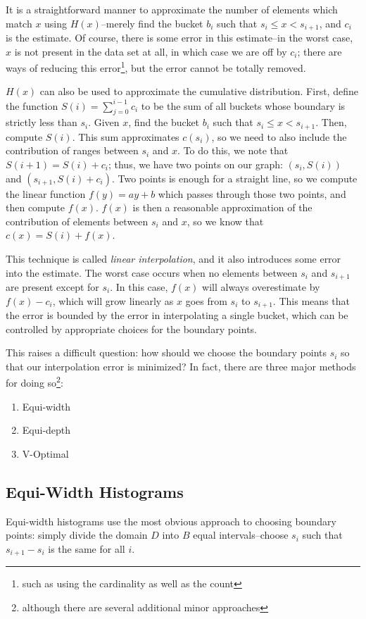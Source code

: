 It is a straightforward manner to approximate the number of elements which match $x$ using $H(x)$--merely find the bucket $b_i$ such that $s_i \leq x < s_{i+1}$, and $c_i$ is the estimate. Of course, there is some error in this estimate--in the worst case, $x$ is not present in the data set at all, in which case we are off by $c_i$; there are ways of reducing this error\footnote{such as using the cardinality as well as the count}, but the error cannot be totally removed.

$H(x)$ can also be used to approximate the cumulative distribution. First, define the function $S(i) = \sum_{j=0}^{i-1} c_i$ to be the sum of all buckets whose boundary is strictly less than $s_i$. Given $x$, find the bucket $b_i$ such that $s_i \leq x < s_{i+1}$. Then, compute $S(i)$. This sum approximates $c(s_i)$, so we need to also include the contribution of ranges between $s_i$ and $x$. To do this, we note that $S(i+1) = S(i) + c_i$; thus, we have two points on our graph: $(s_i,S(i))$ and $(s_{i+1},S(i) +c_i)$. Two points is enough for a straight line, so we compute the linear function $f(y) = ay + b$ which passes through those two points, and then compute $f(x)$. $f(x)$ is then a reasonable approximation of the contribution of elements between $s_i$ and $x$, so we know that $c(x) = S(i) + f(x)$.

								This technique is called \emph{linear interpolation}, and it also introduces some error into the estimate. The worst case occurs when no elements between $s_i$ and $s_{i+1}$ are present except for $s_i$. In this case, $f(x)$ will always overestimate by $f(x) - c_i$, which will grow linearly as $x$ goes from $s_i$ to $s_{i+1}$. This means that the error is bounded by the error in interpolating a single bucket, which can be controlled by appropriate choices for the boundary points.

								This raises a difficult question: how should we choose the boundary points $s_i$ so that our interpolation error is minimized? In fact, there are three major methods for doing so\footnote{although there are several additional minor approaches}:

\begin{enumerate}
				\item Equi-width
				\item Equi-depth
				\item V-Optimal
\end{enumerate}

\subsection{Equi-Width Histograms}
\label{sec:EquiWidth}
Equi-width histograms use the most obvious approach to choosing boundary points: simply divide the domain $D$ into $B$ equal intervals--choose $s_i$ such that $s_{i+1}-s_i$ is the same for all $i$.

